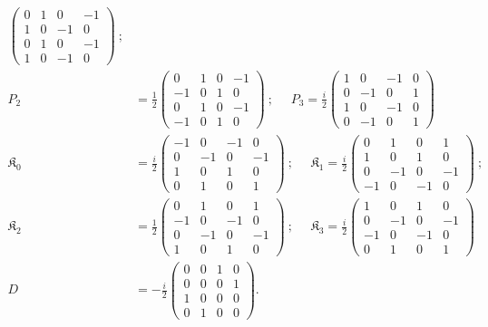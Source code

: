 \documentclass[foundations,article,submit,pdftex,moreauthors]{Definitions/mdpi}
\begin{document}
\begin{align*}
\begin{pmatrix}
    0&1&0&-1\\
    1&0&-1&0\\
    0&1&0&-1\\
    1&0&-1&0
    \end{pmatrix}~;\\
    P_2&=\frac{1}{2}\begin{pmatrix}
    0&1&0&-1\\
    -1&0&1&0\\
    0&1&0&-1\\
    -1&0&1&0
    \end{pmatrix}~;~~~~~~P_3=\frac{i}{2}\begin{pmatrix}
    1&0&-1&0\\
    0&-1&0&1\\
    1&0&-1&0\\
    0&-1&0&1
    \end{pmatrix}\\
    \mathfrak{K}_0&=\frac{i}{2}\begin{pmatrix}
    -1&0&-1&0\\
    0&-1&0&-1\\
    1&0&1&0\\
    0&1&0&1
    \end{pmatrix}~;~~~~~~\mathfrak{K}_1=\frac{i}{2}\begin{pmatrix}
    0&1&0&1\\
    1&0&1&0\\
    0&-1&0&-1\\
    -1&0&-1&0
    \end{pmatrix}~;\\
    \mathfrak{K}_2&=\frac{1}{2}\begin{pmatrix}
    0&1&0&1\\
    -1&0&-1&0\\
    0&-1&0&-1\\
    1&0&1&0
    \end{pmatrix}~;~~~~~~\mathfrak{K}_3=\frac{i}{2}\begin{pmatrix}
    1&0&1&0\\
    0&-1&0&-1\\
    -1&0&-1&0\\
    0&1&0&1
    \end{pmatrix}\\
    D&={-}\frac{i}{2}\begin{pmatrix}
    0&0&1&0\\
    0&0&0&1\\
    1&0&0&0\\
    0&1&0&0
    \end{pmatrix}.
\end{align*}
\end{document}
